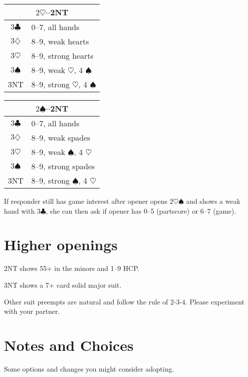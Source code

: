 \documentclass[a4paper, twoside, 11pt]{article}
\begin{document}
\begin{multicols}{3}
\begin{center}
\begin{tabular}{ |c|l| }
 \hline
 \multicolumn{2}{|c|}{$2\heartsuit$--\textnormal{2NT}} \\
 \hline
$3\clubsuit$ & 0--7, all hands\\
$3\diamondsuit$ & 8--9, weak hearts \\
$3\heartsuit$ & 8--9, strong hearts \\
$3\spadesuit$ & 8--9, weak $\heartsuit$, 4 $\spadesuit$ \\
 \textnormal{3NT} & 8--9, strong $\heartsuit$, 4 $\spadesuit$ \\
 \hline
\end{tabular}
\end{center}

\begin{center}
\begin{tabular}{ |c|l| }
 \hline
 \multicolumn{2}{|c|}{$2\spadesuit$--\textnormal{2NT}} \\
 \hline
$3\clubsuit$ & 0--7, all hands\\
$3\diamondsuit$ & 8--9, weak spades \\
$3\heartsuit$ & 8--9, weak $\spadesuit$, 4 $\heartsuit$ \\
$3\spadesuit$ & 8--9, strong spades \\
 \textnormal{3NT} & 8--9, strong $\spadesuit$, 4 $\heartsuit$ \\
 \hline
\end{tabular}
\end{center}

If responder still has game interest after opener opens $2\heartsuit\spadesuit$ and shows a weak hand with $3\clubsuit$, she can then ask if opener has 0--5 (partscore) or 6--7 (game).


\section{Higher openings}

\textnormal{2NT} shows 55+ in the minors and 1--9 HCP.

\textnormal{3NT} shows a 7+ card solid major suit.

Other suit preempts are natural and follow the rule of 2-3-4. Please experiment with your partner.



\section{Notes and Choices}
Some options and changes you might consider adopting.


\end{multicols}
\end{document}

